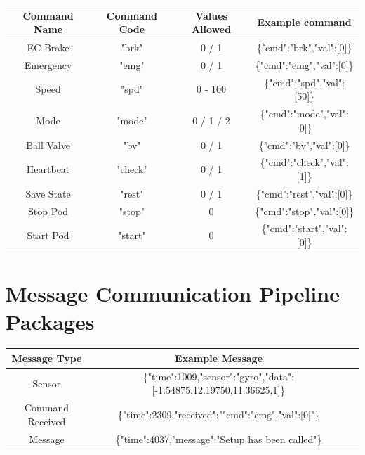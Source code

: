 \documentclass[11pt,a4paper,oldfontcommands]{memoir}
\begin{document}
\begin{center}
    \begin{tabular}{ |c|c|c|c| }
         \hline
            \textbf{Command Name} & \textbf{Command Code} & \textbf{Values Allowed} & \textbf{Example command} \\
         \hline\hline
            EC Brake & "brk" & 0 / 1 & \{"cmd":"brk","val":[0]\} \\ 
         \hline
            Emergency & "emg" & 0 / 1 & \{"cmd":"emg","val":[0]\} \\ 
         \hline
            Speed & "spd" & 0 - 100 & \{"cmd":"spd","val":[50]\} \\ 
         \hline
            Mode & "mode" & 0 / 1 / 2 & \{"cmd":"mode","val":[0]\} \\ 
         \hline
            Ball Valve & "bv" & 0 / 1 & \{"cmd":"bv","val":[0]\} \\ 
         \hline
            Heartbeat & "check" & 0 / 1 & \{"cmd":"check","val":[1]\} \\  
         \hline
            Save State & "rest" & 0 / 1 & \{"cmd":"rest","val":[0]\} \\
         \hline
            Stop Pod & "stop" & 0 & \{"cmd":"stop","val":[0]\} \\  
         \hline
            Start Pod & "start" & 0 & \{"cmd":"start","val":[0]\} \\  
         \hline
    \end{tabular}
\end{center}

\section{Message Communication Pipeline Packages}
\label{appendix:sensor_messages}

\begin{center}
    \begin{tabular}{ |c|c|c| }
        \hline
        \textbf{Message Type} & \textbf{Example Message}\\
        \hline\hline
        Sensor  & \{"time":1009,"sensor":"gyro","data":[-1.54875,12.19750,11.36625,1]\}\\ 
        \hline
        Command Received & \{"time":2309,"received":"{"cmd":"emg","val":[0]}"\} \\
        \hline
        Message & \{"time":4037,"message":"Setup has been called"\} \\
        \hline
    \end{tabular}
\end{center}



\end{document}
